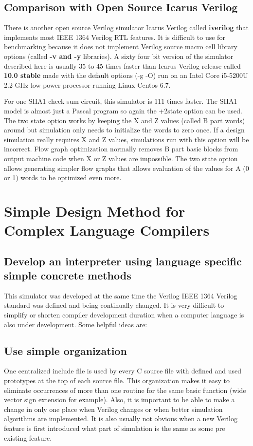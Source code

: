\documentclass[preprint, authoryear]{sigplanconf}
\begin{document}
\subsection{Comparison with Open Source Icarus Verilog}
\par
There is another open source Verilog simulator Icarus
Verilog called \textbf{iverilog} that implements most
IEEE 1364 Verilog RTL features.
It is difficult to use for benchmarking because it does not
implement Verilog source macro cell library options
(called \textbf{-v and -y} libraries).
A sixty four bit version of the simulator described here is usually
35 to 45 times faster than Icarus Verilog release
called \textbf{10.0 stable} made with the 
default options (-g -O) run on an Intel Core i5-5200U 2.2 GHz
low power processor running Linux Centos 6.7.
\par
For one SHA1 check sum circuit, this simulator is 111 times faster.
The SHA1 model is almost just a Pascal program so again
the +2state option can be used.
The two state option works by keeping
the X and Z values (called B part words) around but simulation
only needs to initialize the words to zero once.
If a design simulation really requires X and Z values,
simulations run with this option will be incorrect.
Flow graph optimization normally removes B part basic blocks from output
machine code when X or Z values are impossible.
The two state option allows generating simpler flow graphs that
allows evaluation of the values for A (0 or 1) words to
be optimized even more.
\section{Simple Design Method for Complex Language Compilers}
\subsection{Develop an interpreter using language specific simple concrete methods}  
\par
This simulator was developed at the same time the Verilog IEEE 1364
Verilog standard was defined and being continually changed.
It is very difficult to simplify or shorten compiler development
duration when a computer language is also under development.
Some helpful ideas are:
\subsection{Use simple organization}
\par
One centralized include file is used
by every C source file with defined and used prototypes at the top of each
source file.
This organization makes it easy to eliminate occurrences of more than
one routine for the same basic function
(wide vector sign extension for example).
Also, it is important to be able to make a change in only one place
when Verilog changes or when better simulation algorithms are implemented.
It is also usually not obvious when a new Verilog feature
is first introduced what part of simulation is the same as some pre existing
feature.
\end{document}
